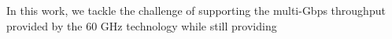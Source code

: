 \begin{comment}
Millimeter-wave (mmWave) wireless is fast emerging as the prime
candidate technology for providing multi-Gbps data rates in future wireless networks.
The IEEE 802.11ad
standard 
provides data rates of up to 6.7 Gbps. 
It
achieves this multi-fold increase over legacy WiFi through
2 GHz-wide channels.
Nonetheless, communication at mmWave frequencies faces fundamental
challenges due to the high propagation and penetration loss. %
The use of directional transmissions 
makes
links susceptible to disruption by human blockage and client
mobility. 
Even if future PHY/MAC improvements may result in faster beam steering, any realistic
indoor scenario is expected to contain enough dynamism
to cause a large number of re-connection events.
\end{comment}
In this work, we tackle the challenge of supporting the multi-Gbps
throughput provided by the 60 GHz technology while still providing
